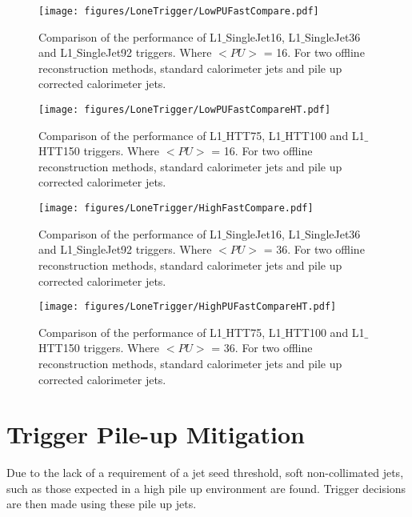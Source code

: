 \begin{figure}[htbp]
  \centering
    \texttt{[image: figures/LoneTrigger/LowPUFastCompare.pdf]}
  \caption{Comparison of the performance of  L1$\_$SingleJet16, L1$\_$SingleJet36 and  L1$\_$SingleJet92 triggers. Where $<PU>$ = 16. For two offline reconstruction methods, standard \AK calorimeter jets and pile up corrected \AK calorimeter jets.}
  \label{fig:figures_LoneTrigger_LowPUFastCompare}
\end{figure}


\begin{figure}[htbp]
  \centering
    \texttt{[image: figures/LoneTrigger/LowPUFastCompareHT.pdf]}
  \caption{Comparison of the performance of L1$\_$HTT75, L1$\_$HTT100 and  L1$\_$HTT150 triggers. Where $<PU>$ = 16. For two offline reconstruction methods, standard \AK calorimeter jets and pile up corrected \AK calorimeter jets.}
  \label{fig:figures_LoneTrigger_LowPUFastCompareHT}
\end{figure}


\begin{figure}[htbp]
  \centering
    \texttt{[image: figures/LoneTrigger/HighFastCompare.pdf]}
  \caption{Comparison of the performance of L1$\_$SingleJet16, L1$\_$SingleJet36 and L1$\_$SingleJet92 triggers. Where $<PU>$ = 36. For two offline reconstruction methods, standard \AK calorimeter jets and pile up corrected \AK calorimeter jets.}
  \label{fig:figures_LoneTrigger_HighFastCompare}
\end{figure}

\begin{figure}[htbp]
  \centering
    \texttt{[image: figures/LoneTrigger/HighPUFastCompareHT.pdf]}
  \caption{Comparison of the performance of  L1$\_$HTT75, L1$\_$HTT100 and  L1$\_$HTT150 triggers. Where $<PU>$ = 36. For two offline reconstruction methods, standard \AK calorimeter jets and pile up corrected \AK calorimeter jets.}
  \label{fig:figures_LoneTrigger_HighPUFastCompareHT}
\end{figure}

\clearpage
\section{\Lone Trigger Pile-up Mitigation} %
\label{sub:lone_trigger_pile_up_mitigation}
Due to the lack of a requirement of a jet seed threshold, soft non-collimated 
jets, such as those expected in a high pile up environment are found. Trigger 
decisions are then made using these pile up jets.


